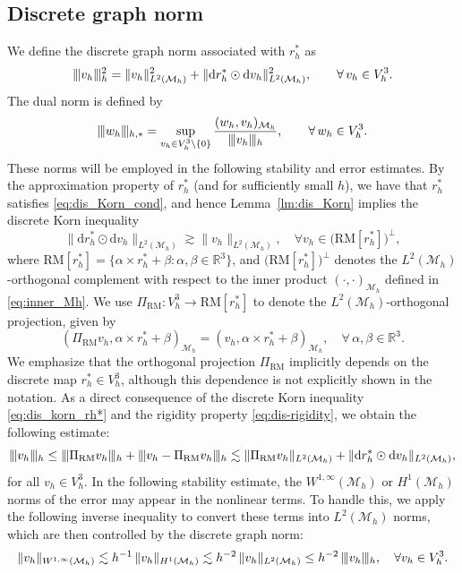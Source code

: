 \documentclass[11pt,a4paper,oneside,reqno]{amsart}
\theoremstyle{definition}
\theoremstyle{plain}
\numberwithin{theorem}{section}
\numberwithin{proposition}{section}
\numberwithin{lemma}{section}
\numberwithin{equation}{section}
\newcommand{\Man}{\mathcal{M}}
\newcommand{\RM}{\mathrm{RM}}
\newcommand{\normt}[1]{%
	\vert\kern-0.9pt\vert\kern-0.9pt\vert #1
	\vert\kern-0.9pt\vert\kern-0.9pt\vert}
\begin{document}
\subsection{Discrete graph norm}\label{subsec:dis_graph_norm}
We define the discrete graph norm associated with \( r_h^* \) as
\begin{equation}\label{eq:dis_graph_norm}
\normt{v_h}_h^2 = \|v_h\|_{L^2(\Man_h)}^2 + \| \mathrm{d} r_h^* \odot \mathrm{d} v_h \|_{L^2(\Man_h)}^2,
\qquad \forall\, v_h \in V_h^3.
\end{equation}
The dual norm is defined by
\[
\normt{w_h}_{h,*} = \sup_{v_h \in V_h^3 \setminus \{0\}} 
\frac{  (w_h, v_h)_{\Man_h} }{ \normt{v_h}_h },
\qquad \forall\, w_h \in V_h^3.
\]
These norms will be employed in the following stability and error estimates.
By the approximation property of \( r_h^* \) (and for sufficiently small \(h\)), we have that \(r_h^*\) satisfies \eqref{eq:dis_Korn_cond},
and hence Lemma~\ref{lm:dis_Korn} implies the discrete Korn inequality
\begin{equation}\label{eq:dis_korn_rh*}
\| \mathrm{d} r_h^* \odot \mathrm{d} v_h \|_{L^2(\Man_h)} \gtrsim \| v_h \|_{L^2(\Man_h)},
\quad \forall v_h \in \big(\RM[r_h^*]\big)^{\perp},
\end{equation}
where \(\RM[r_h^*]=\{\alpha\times r_h^*+\beta:\alpha,\beta\in\mathbb{R}^3\}\), and \(\big(\RM[r_h^*]\big)^{\perp}\) denotes the \(L^2(\Man_h)\)-orthogonal complement with respect to the inner product \((\cdot,\cdot)_{\Man_h}\) defined in \eqref{eq:inner_Mh}. 
We use \( \Pi_{\RM}: V_h^3 \to \RM[r_h^*] \) to denote the \( L^2(\Man_h) \)-orthogonal projection, given by
\begin{equation}\label{eq:Pi_RM}
( \Pi_{\RM} v_h, \alpha \times r_h^* + \beta )_{\Man_h}
= ( v_h, \alpha \times r_h^* + \beta )_{\Man_h},
\quad \forall\, \alpha, \beta \in \mathbb{R}^3.
\end{equation}
We emphasize that the orthogonal projection $\Pi_{\RM}$ implicitly depends on the discrete map 
$r_h^* \in V_h^3$, although this dependence is not explicitly shown in the notation. 
As a direct consequence of the discrete Korn inequality \eqref{eq:dis_korn_rh*} and the rigidity property \eqref{eq:dis-rigidity}, we obtain the following estimate:
\begin{equation}\label{eq:graphnorm_esti}
\normt{v_h}_h \leq \normt{\Pi_{\RM} v_h}_h + \normt{ v_h - \Pi_{\RM} v_h}_h
\lesssim \|\Pi_{\RM} v_h \|_{L^2(\Man_h)} +  
\|\mathrm{d} r_h^* \odot \mathrm{d} v_h\|_{L^2(\Man_h)},
\end{equation}
for all \( v_h \in V_h^3 \).
In the following stability estimate, the $W^{1,\infty}(\Man_h)$ or $H^1(\Man_h)$ norms of the error may appear in the nonlinear terms. To handle this, we apply the following inverse inequality to convert these terms into $L^2(\Man_h)$ norms, which are then controlled by the discrete graph norm:
\begin{equation}\label{eq:inv}
\|v_h\|_{W^{1,\infty}(\Man_h)} \lesssim h^{-1}\,\|v_h\|_{H^1(\Man_h)} \lesssim h^{-2}\,\|v_h\|_{L^2(\Man_h)} \leq h^{-2}\,\normt{v_h}_h, \quad \forall v_h \in V_h^3.
\end{equation}
\end{document}

